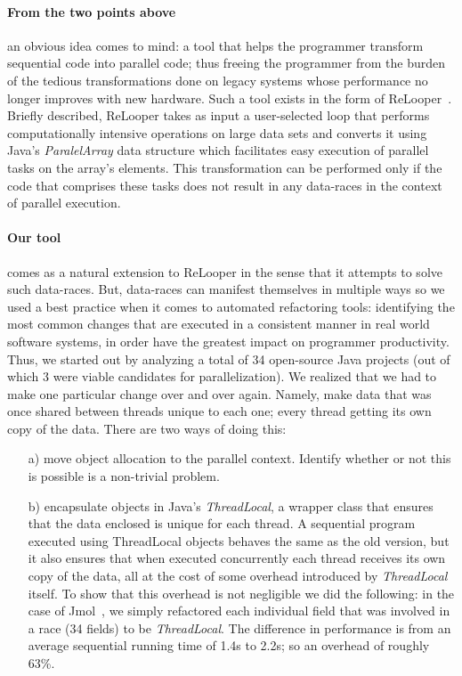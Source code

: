 \paragraph{From the two points above}an obvious idea comes to mind: a tool that
helps the programmer transform sequential code into parallel code; thus freeing
the programmer from the burden of the tedious transformations done on legacy
systems whose performance no longer improves with new hardware.
Such a tool exists in the form of ReLooper~\cite{ReLooper}. Briefly described,
ReLooper takes as input a user-selected loop that performs computationally
intensive operations on large data sets and converts it using Java's
\emph{ParalelArray} data structure which facilitates easy execution of parallel
tasks on the array's elements. This transformation can be performed only if the
code that comprises these tasks does not result in any data-races in the context
of parallel execution.

\paragraph{Our tool}comes as a natural extension to ReLooper in the sense that
it attempts to solve such data-races. But, data-races can manifest themselves in
multiple ways so we used a best practice when it comes to automated
refactoring tools: identifying the most common changes that are
executed in a consistent manner in real world software systems, in order have
the greatest impact on programmer productivity. Thus, we started out by
analyzing a total of 34 open-source Java projects (out of which 3 were viable
candidates for parallelization). We realized that we had to make one particular
change over and over again. Namely, make data that was once shared between
threads unique to each one; every thread getting its own copy of the data. There
are two ways of doing this: 
\begin{enumerate} 
  \item [a)] move object allocation to the parallel context. Identify whether or
  not this is possible is a non-trivial problem. 
  \item [b)] encapsulate objects in Java's \emph{ThreadLocal}, a wrapper class
  that ensures that the data enclosed is unique for each thread. A sequential
  program executed using ThreadLocal objects behaves the same as the old
  version, but it also ensures that when executed concurrently each thread
  receives its own copy of the data, all at the cost of some overhead
  introduced by \emph{ThreadLocal} itself. To show that this overhead is not
  negligible we did the following: in the case of Jmol~\cite{Jmol-site}, we
  simply refactored each individual field that was involved in a race (34
  fields) to be \emph{ThreadLocal}. The difference in performance is from an
  average sequential running time of 1.4s to 2.2s; so an overhead of roughly
  63\%.
\end{enumerate}

